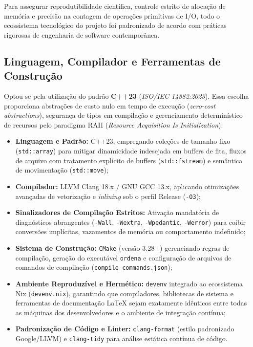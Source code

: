 \documentclass[12pt,a4paper]{article}
\begin{document}
Para assegurar reprodutibilidade científica, controle estrito de alocação de memória e precisão na contagem de operações primitivas de I/O, todo o ecossistema tecnológico do projeto foi padronizado de acordo com práticas rigorosas de engenharia de software contemporânea.

\subsection{Linguagem, Compilador e Ferramentas de Construção}
Optou-se pela utilização do padrão \textbf{C++23} (\textit{ISO/IEC 14882:2023}). Essa escolha proporciona abstrações de custo nulo em tempo de execução (\textit{zero-cost abstractions}), segurança de tipos em compilação e gerenciamento determinístico de recursos pelo paradigma RAII (\textit{Resource Acquisition Is Initialization}):
\begin{itemize}
    \item \textbf{Linguagem e Padrão:} C++23, empregando coleções de tamanho fixo (\texttt{std::array}) para mitigar dinamicidade indesejada em buffers de fita, fluxos de arquivo com tratamento explícito de buffers (\texttt{std::fstream}) e semântica de movimentação (\texttt{std::move});
    \item \textbf{Compilador:} LLVM Clang 18.x / GNU GCC 13.x, aplicando otimizações avançadas de vetorização e \textit{inlining} sob o perfil Release (\texttt{-O3});
    \item \textbf{Sinalizadores de Compilação Estritos:} Ativação mandatória de diagnósticos abrangentes (\texttt{-Wall}, \texttt{-Wextra}, \texttt{-Wpedantic}, \texttt{-Werror}) para coibir conversões implícitas, vazamentos de memória ou comportamento indefinido;
    \item \textbf{Sistema de Construção:} \texttt{CMake} (versão 3.28+) gerenciando regras de compilação, geração do executável \texttt{ordena} e configuração de arquivos de comandos de compilação (\texttt{compile\_commands.json});
    \item \textbf{Ambiente Reproduzível e Hermético:} \texttt{devenv} integrado ao ecossistema Nix (\texttt{devenv.nix}), garantindo que compiladores, bibliotecas de sistema e ferramentas de documentação LaTeX sejam exatamente idênticos entre todas as máquinas dos desenvolvedores e o ambiente de integração contínua;
    \item \textbf{Padronização de Código e Linter:} \texttt{clang-format} (estilo padronizado Google/LLVM) e \texttt{clang-tidy} para análise estática contínua de código.
\end{itemize}
\end{document}

